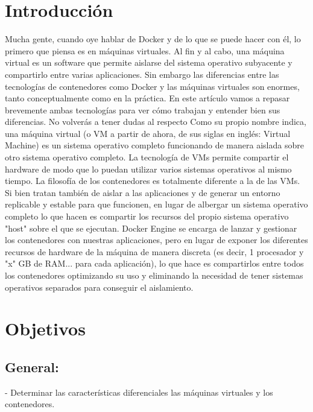 \documentclass[%
 reprint,
 amsmath,amssymb,
 aps,
]{revtex4-1}
\begin{document}
\maketitle


\section {Introducción}\label{sec:1}

Mucha gente, cuando oye hablar de Docker y de lo que se puede hacer con él, lo primero que piensa es en máquinas virtuales. Al fin y al cabo, una máquina virtual es un software que permite aislarse del sistema operativo subyacente y compartirlo entre varias aplicaciones.
Sin embargo las diferencias entre las tecnologías de contenedores como Docker y las máquinas virtuales son enormes, tanto conceptualmente como en la práctica.
En este artículo vamos a repasar brevemente ambas tecnologías para ver cómo trabajan y entender bien sus diferencias. No volverás a tener dudas al respecto 
Como su propio nombre indica, una máquina virtual (o VM a partir de ahora, de sus siglas en inglés: Virtual Machine) es un sistema operativo completo funcionando de manera aislada sobre otro sistema operativo completo.
La tecnología de VMs permite compartir el hardware de modo que lo puedan utilizar varios sistemas operativos al mismo tiempo.
La filosofía de los contenedores es totalmente diferente a la de las VMs. Si bien tratan también de aislar a las aplicaciones y de generar un entorno replicable y estable para que funcionen, en lugar de albergar un sistema operativo completo lo que hacen es compartir los recursos del propio sistema operativo "host" sobre el que se ejecutan.
Docker Engine se encarga de lanzar y gestionar los contenedores con nuestras aplicaciones, pero en lugar de exponer los diferentes recursos de hardware de la máquina de manera discreta (es decir, 1 procesador y "x" GB de RAM... para cada aplicación), lo que hace es compartirlos entre todos los contenedores optimizando su uso y eliminando la necesidad de tener sistemas operativos separados para conseguir el aislamiento.





\section{Objetivos}\label{sec:2}
\subsection{General:}
-  Determinar las características diferenciales las máquinas virtuales y los contenedores.
\end{document}

